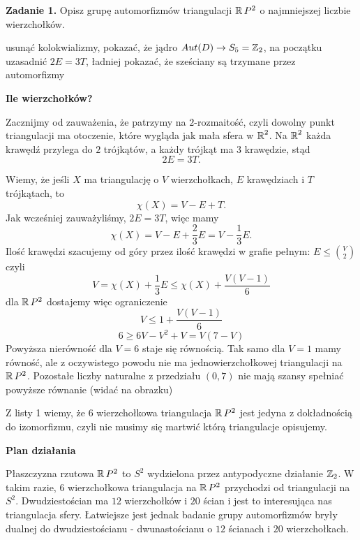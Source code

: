 \textbf{\large\color{orange}Zadanie 1.} Opisz grupę automorfizmów triangulacji $\operatorname{\mathbb{R}} P^2$ o najmniejszej liczbie wierzchołków.

{\large\color{red}usunąć kolokwializmy, pokazać, że jądro $Aut(D)\to S_5=\operatorname{\mathbb{Z}}_2$, na początku uzasadnić $2E=3T$, ładniej pokazać, że sześciany są trzymane przez automorfizmy}

\textbf{Ile wierzchołków?}

Zacznijmy od zauważenia, że patrzymy na $2$-rozmaitość, czyli dowolny punkt triangulacji ma otoczenie, które wygląda jak mała sfera w $\operatorname{\mathbb{R}}^2$. Na $\operatorname{\mathbb{R}}^2$ każda krawędź przylega do $2$ trójkątów, a każdy trójkąt ma $3$ krawędzie, stąd
$$2E=3T.$$

Wiemy, że jeśli $X$ ma triangulację o $V$ wierzchołkach, $E$ krawędziach i $T$ trójkątach, to 
$$\chi(X)=V-E+T.$$
Jak wcześniej zauważyliśmy, $2E=3T$, więc mamy
$$\chi(X)=V-E+\frac{2}{3}E=V-\frac{1}{3}E.$$
Ilość krawędzi szacujemy od góry przez ilość krawędzi w grafie pełnym: $E\leq \binom{V}{2}$ czyli
$$V=\chi(X)+\frac{1}{3}E\leq \chi(X)+\frac{V(V-1)}{6}$$
dla $\operatorname{\mathbb{R}} P^2$ dostajemy więc ograniczenie
$$V\leq 1+\frac{V(V-1)}{6}$$
$$6\geq 6V-V^2+V=V(7-V)$$
Powyższa nierówność dla $V=6$ staje się równością. Tak samo dla $V=1$ mamy równość, ale z oczywistego powodu nie ma jednowierzchołkowej triangulacji na $\operatorname{\mathbb{R}} P^2$. Pozostałe liczby naturalne z przedziału $(0, 7)$ nie mają szansy spełniać powyższe równanie (widać na obrazku)
\begin{center}
\end{center}

Z listy 1 wiemy, że $6$ wierzchołkowa triangulacja $\operatorname{\mathbb{R}} P^2$ jest jedyna z dokładnością do izomorfizmu, czyli nie musimy się martwić którą triangulacje opisujemy.

\textbf{Plan działania}

Płaszczyzna rzutowa $\operatorname{\mathbb{R}} P^2$ to $S^2$ wydzielona przez antypodyczne działanie $\operatorname{\mathbb{Z}}_2$. W takim razie, $6$ wierzchołkowa triangulacja na $\operatorname{\mathbb{R}} P^2$ przychodzi od triangulacji na $S^2$. Dwudziestościan ma $12$ wierzchołków i $20$ ścian i jest to interesująca nas triangulacja sfery. Łatwiejsze jest jednak badanie grupy automorfizmów bryły dualnej do dwudziestościanu - dwunastościanu o $12$ ścianach i $20$ wierzchołkach.


